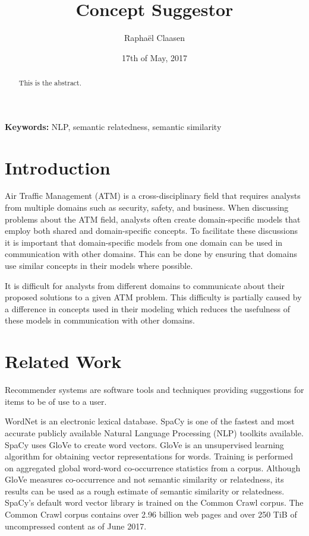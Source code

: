 \documentclass{article}
\title{Concept Suggestor}
\date{17th of May, 2017}
\author{Rapha\"el Claasen}
\begin{document}
\maketitle

\begin{abstract}
This is the abstract.
\end{abstract}

{\bf Keywords:} NLP, semantic relatedness, semantic similarity

\section{Introduction}

Air Traffic Management (ATM) is a cross-disciplinary field that requires analysts from multiple domains such as security, safety, and business. When discussing problems about the ATM field, analysts often create domain-specific models that employ both shared and domain-specific concepts. To facilitate these discussions it is important that domain-specific models from one domain can be used in communication with other domains. This can be done by ensuring that domains use similar concepts in their models where possible.

It is difficult for analysts from different domains to communicate about their proposed solutions to a given ATM problem. This difficulty is partially caused by a difference in concepts used in their modeling which reduces the usefulness of these models in communication with other domains. %

\section{Related Work}

Recommender systems are software tools and techniques providing suggestions for items to be of use to a user\cite{ricci2011introduction}. %

WordNet is an electronic lexical database\cite{kilgarriff2000wordnet}. %
SpaCy is one of the fastest and most accurate publicly available Natural Language Processing (NLP) toolkits available\cite{choi2015depends}.
SpaCy uses GloVe to create word vectors. GloVe is an unsupervised learning algorithm for obtaining vector representations for words. Training is performed on aggregated global word-word co-occurrence statistics from a corpus\cite{pennington2014glove}. Although GloVe measures co-occurrence and not semantic similarity or relatedness, its results can be used as a rough estimate of semantic similarity or relatedness\cite{levy2015improving}. SpaCy's default word vector library is trained on the Common Crawl corpus. The Common Crawl corpus contains over 2.96 billion web pages and over 250 TiB of uncompressed content as of June 2017\cite{nagel2017commoncrawl}. %
\end{document}
